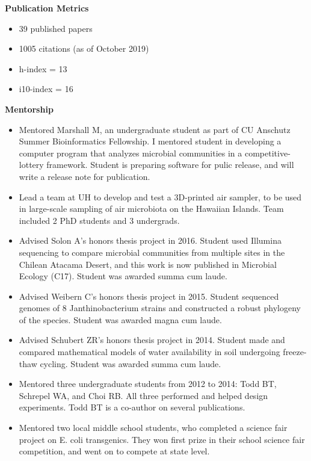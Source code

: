 \documentclass{article}
\begin{document}
\begingroup
  \setlength\bibitemsep{0pt}
  \nocite{*}
  \printbibliography[keyword=coauthor, heading=none]
\endgroup
%
\vspace{-1em}\vspace{3mm}
{\large  \textbf{Publication Metrics}}
\begin{adjustwidth}{5mm}{}
  \begin{multicols}{2}
    \begin{itemize}[noitemsep,topsep=0pt, leftmargin=0mm]
      \item 39 published papers
      \item 1005 citations (as of October 2019)
      \item h-index = 13
      \item i10-index = 16
    \end{itemize}
  \end{multicols}
\end{adjustwidth}
\vspace{3mm}\filbreak
{\large  \textbf{Mentorship}}
\begin{itemize}[noitemsep,topsep=0pt, leftmargin=5mm]
  \item Mentored Marshall M, an undergraduate student as part of CU Anschutz Summer Bioinformatics Fellowship. I mentored student in developing a computer program that analyzes microbial communities in a competitive-lottery framework. Student is preparing software for pulic release, and will write a release note for publication.
  \item Lead a team at UH to develop and test a 3D-printed air sampler, to be used in large-scale sampling of air microbiota on the Hawaiian Islands. Team included 2 PhD students and 3 undergrads.
  \item Advised Solon A’s honors thesis project in 2016. Student used Illumina sequencing to compare microbial communities from multiple sites in the Chilean Atacama Desert, and this work is now published in Microbial Ecology (C17). Student was awarded summa cum laude.
  \item Advised Weibern C’s honors thesis project in 2015. Student sequenced genomes of 8 Janthinobacterium strains and constructed a robust phylogeny of the species. Student was awarded magna cum laude.
  \item Advised Schubert ZR’s honors thesis project in 2014. Student made and compared mathematical models of water availability in soil undergoing freeze-thaw cycling. Student was awarded summa cum laude.
  \item Mentored three undergraduate students from 2012 to 2014: Todd BT, Schrepel WA, and Choi RB. All three performed and helped design experiments. Todd BT is a co-author on several publications.
  \item Mentored two local middle school students, who completed a science fair project on E. coli transgenics. They won first prize in their school science fair competition, and went on to compete at state level.
\end{itemize}
\end{document}
